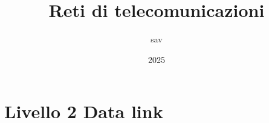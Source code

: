 \documentclass{report}
\title{Reti di telecomunicazioni}
\author{sav}
\date{2025}
\begin{document}
\maketitle
\tableofcontents


%


%

%

%

\chapter{Livello 2 Data link}


%

\newpage

%

%
\end{document}
